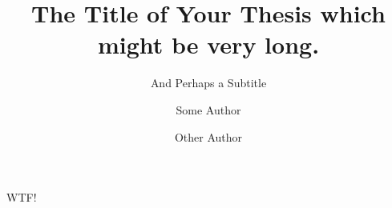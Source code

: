 \documentclass{chalmers-thesis}
\title{The Title of Your Thesis which might be very long.}
\subtitle{And Perhaps a Subtitle}
\author{Some Author\and Other Author}
\newcounter{paper}
\newcommand{\paper}[2]{WTF!}
\begin{document}
\maketitle


\newpage
\mbox{}


\paper{Assessment of acceleration modeling for fluid-filled porous media subjected to dynamic loading}{cite1}



% 
% 

%

\end{document}
